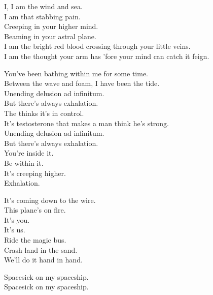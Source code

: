 
I, I am the wind and sea. \\
I am that stabbing pain. \\
Creeping in your higher mind. \\
Beaming in your astral plane. \\
I am the bright red blood crossing through your little veins. \\
I am the thought your arm has 'fore your mind can catch it feign. \\


You've been bathing within me for some time. \\
Between the wave and foam, I have been the tide. \\
Unending delusion ad infinitum. \\
But there's always exhalation. \\
The  thinks it's in control. \\
It's testosterone that makes a man think he's strong. \\
Unending delusion ad infinitum. \\
But there's always exhalation. \\

You're inside it. \\
Be within it. \\
It's creeping higher. \\
Exhalation. \\


It's coming down to the wire. \\
This plane's on fire. \\
It's you. \\
It's us. \\
Ride the magic bus. \\
Crash land in the sand. \\
We'll do it hand in hand. \\




Spacesick on my spaceship. \\
Spacesick on my spaceship. \\

